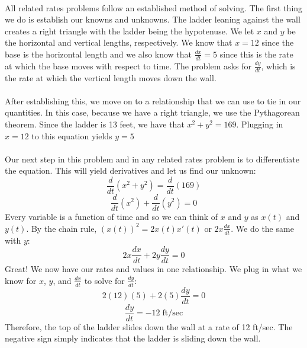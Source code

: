 \documentclass[11pt]{scrartcl}
\begin{document}
\noindent\\
All related rates problems follow an established method of solving. The first thing we do is establish our knowns and unknowns. The ladder leaning against the wall creates a right triangle with the ladder being the hypotenuse. We let $x$ and $y$ be the horizontal and vertical lengths, respectively. We know that $x=12$ since the base is the horizontal length and we also know that $\frac{dx}{dt}=5$ since this is the rate at which the base moves with respect to time. The problem asks for $\frac{dy}{dt}$, which is the rate at which the vertical length moves down the wall.\\
\noindent\\
After establishing this, we move on to a relationship that we can use to tie in our quantities. In this case, because we have a right triangle, we use the Pythagorean theorem. Since the ladder is 13 feet, we have that $x^2+y^2=169$. Plugging in $x=12$ to this equation yields $y=5$ \\
\\
\noindent
Our next step in this problem and in any related rates problem is to differentiate the equation. This will yield derivatives and let us find our unknown: 
$$\frac{d}{dt}(x^2+y^2)=\frac{d}{dt}(169)$$
$$\frac{d}{dt}(x^2)+\frac{d}{dt}(y^2)=0$$
Every variable is a function of time and so we can think of $x$ and $y$ as $x(t)$ and $y(t)$. By the chain rule, $(x(t))^2=2x(t)x'(t)$ or $2x\frac{dx}{dt}$. We do the same with $y$:
$$2x\frac{dx}{dt}+2y\frac{dy}{dt}=0$$
Great! We now have our rates and values in one relationship. We plug in what we know for $x$, $y$, and $\frac{dx}{dt}$ to solve for $\frac{dy}{dt}$:
$$2(12)(5)+2(5)\frac{dy}{dt}=0$$
$$\frac{dy}{dt}=-12\; \text{ft/sec}$$
Therefore, the top of the ladder slides down the wall at a rate of 12 ft/sec. The negative sign simply indicates that the ladder is sliding down the wall. 
\end{document}
